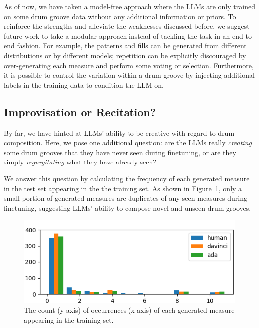 \documentclass[letterpaper]{article} %
\begin{document}
As of now, we have taken a model-free approach where the LLMs are only trained on some drum groove data without any additional information or priors. To reinforce the strengths and alleviate the weaknesses discussed before, we suggest future work to take a modular approach instead of tackling the task in an end-to-end fashion. For example, the patterns and fills can be generated from different distributions or by different models; repetition can be explicitly discouraged by over-generating each measure and perform some voting or selection. Furthermore, it is possible to control the variation within a drum groove by injecting additional labels in the training data to condition the LLM on.

\subsection{Improvisation or Recitation?}
By far, we have hinted at LLMs' ability to be creative with regard to drum composition. Here, we pose one additional question: are the LLMs really \textit{creating} some drum grooves that they have never seen during finetuning, or are they simply \textit{regurgitating} what they have already seen?

We answer this question by calculating the frequency of each generated measure in the test set appearing in the the training set. As shown in Figure~\ref{fig:duplication}, only a small portion of generated measures are duplicates of any seen measures during finetuning, suggesting LLMs' ability to compose novel and unseen drum grooves.

\begin{figure}
\centering
\includegraphics[scale=0.43200000000000005]{images/duplication.png}
\caption{The count (y-axis) of occurrences (x-axis) of each generated measure appearing in the training set.}
\label{fig:duplication}
\end{figure}

\vspace{-1.57mm}
\vspace{-3.15mm}
\end{document}
